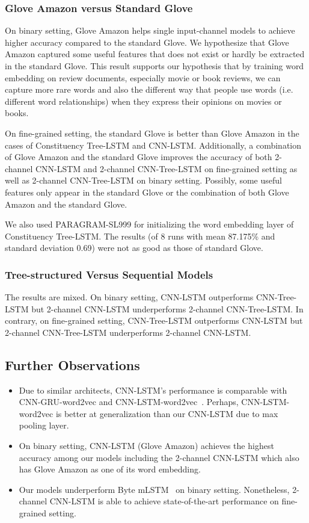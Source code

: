 \subsubsection{Glove Amazon versus Standard Glove}
On binary setting, Glove Amazon helps single input-channel models to achieve higher accuracy compared to the standard Glove.
We hypothesize that Glove Amazon captured some useful features that does not exist or hardly be extracted in the standard Glove.
This result supports our hypothesis that by training word embedding on review documents, especially movie or book reviews, we can capture more rare words and also the different way that people use words (i.e. different word relationships) when they express their opinions on movies or books.

On fine-grained setting, the standard Glove is better than Glove Amazon in the cases of Constituency Tree-LSTM and CNN-LSTM.
Additionally, a combination of Glove Amazon and the standard Glove improves the accuracy of both 2-channel CNN-LSTM and 2-channel CNN-Tree-LSTM on fine-grained setting as well as 2-channel CNN-Tree-LSTM on binary setting.
Possibly, some useful features only appear in the standard Glove or the combination of both Glove Amazon and the standard Glove.

We also used PARAGRAM-SL999 for initializing the word embedding layer of Constituency Tree-LSTM.
The results (of 8 runs with mean 87.175\% and standard deviation 0.69) were not as good as those of standard Glove.
\subsubsection{Tree-structured Versus Sequential Models}
The results are mixed.
On binary setting, CNN-LSTM outperforms CNN-Tree-LSTM but 2-channel CNN-LSTM underperforms 2-channel CNN-Tree-LSTM.
In contrary, on fine-grained setting, CNN-Tree-LSTM
outperforms CNN-LSTM but 2-channel CNN-Tree-LSTM underperforms 2-channel CNN-LSTM.
\subsection{Further Observations}
\begin{itemize}
	\item Due to similar architects, CNN-LSTM's performance is comparable with CNN-GRU-word2vec and CNN-LSTM-word2vec~\cite{cnn-rnn}.
	Perhaps, CNN-LSTM-word2vec is better at generalization than our CNN-LSTM due to max pooling layer.
	\item On binary setting, CNN-LSTM (Glove Amazon) achieves the highest accuracy among our models including the 2-channel CNN-LSTM which also has Glove Amazon as one of its word embedding.
	\item Our models underperform Byte mLSTM~\cite{mlstm} on binary setting.
	Nonetheless, 2-channel CNN-LSTM is able to achieve state-of-the-art performance on fine-grained setting.
\end{itemize}
